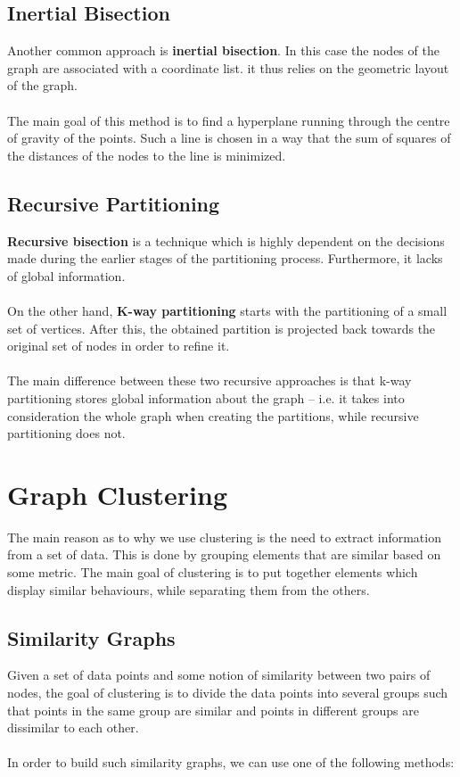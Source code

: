 \documentclass{article}
\begin{document}
\subsection{Inertial Bisection}
Another common approach is \textbf{inertial bisection}. In this case the nodes of the graph are associated with a coordinate list. it thus relies on the geometric layout of the graph. \\ \\
The main goal of this method is to find a hyperplane running through the centre of gravity of the points. Such a line is chosen in a way that the sum of squares of the distances of the nodes to the line is minimized.

\subsection{Recursive Partitioning}
\textbf{Recursive bisection} is a technique which is highly dependent on the decisions made during the earlier stages of the partitioning process. Furthermore, it lacks of global information. \\ \\
On the other hand, \textbf{K-way partitioning} starts with the partitioning of a small set of vertices. After this, the obtained partition is projected back towards the original set of nodes in order to refine it. \\ \\
The main difference between these two recursive approaches is that k-way partitioning stores global information about the graph -- i.e. it takes into consideration the whole graph when creating the partitions, while recursive partitioning does not.

\section{Graph Clustering}
The main reason as to why we use clustering is the need to extract information from a set of data. This is done by grouping elements that are similar based on some metric. The main goal of clustering is to put together elements which display similar behaviours, while separating them from the others.

\subsection{Similarity Graphs}
Given a set of data points and some notion of similarity between two pairs of nodes, the goal of clustering is to divide the data points into several groups such that points in the same group are similar and points in different groups are dissimilar to each other. \\ \\
In order to build such similarity graphs, we can use one of the following methods:
\end{document}
